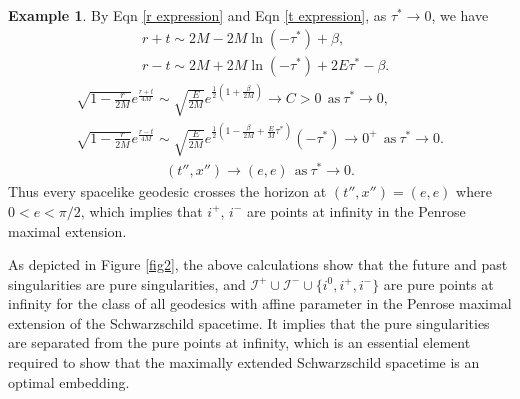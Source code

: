 \documentclass[pdflatex,sn-mathphys-num]{sn-jnl}
\makeatletter
\newcommand{\vast}{\bBigg@{2}}
\theoremstyle{definition}
\newtheorem{ex}[theorem]{Example}
\makeatother
\begin{document}
\begin{ex}
    By Eqn \ref{r expression} and Eqn \ref{t expression}, as $\tau^* \rightarrow 0$, we have
    \begin{align*}
        &r + t \sim 2M - 2M\ln{(-\tau^*)} + \beta,\\
        &r - t \sim 2M + 2M\ln{(-\tau^*)} + 2E\tau^* - \beta.
    \end{align*}
    \begin{align*}
        \sqrt{1 - \frac{r}{2M}}e^{\frac{r+t}{4M}} \sim \sqrt{\frac{E}{2M}}e^{\frac{1}{2}(1 + \frac{\beta}{2M})} \rightarrow C > 0~~\text{as}~\tau^* \rightarrow 0,\\
        \sqrt{1 - \frac{r}{2M}}e^{\frac{r-t}{4M}} \sim \sqrt{\frac{E}{2M}}e^{\frac{1}{2}(1 - \frac{\beta}{2M} + \frac{E}{M}\tau^*)}(-\tau^*) \rightarrow 0^+~~\text{as}~\tau^* \rightarrow 0.
    \end{align*}
    \begin{align}
        (t'',x'') \rightarrow (e,e)~~\text{as}~\tau^* \rightarrow 0.
    \end{align}
    Thus every spacelike geodesic crosses the horizon at $(t'',x'') = (e,e)$ where $ 0 < e < \pi/2$, which implies that $i^+$, $i^-$ are points at infinity in the Penrose maximal extension.
\end{ex}

As depicted in Figure \ref{fig2}, the above calculations show that the future and past singularities are pure singularities, and $\mathscr{I}^{+} \cup \mathscr{I}^{-} \cup \{i^0,i^{+},i^{-}\}$ are pure points at infinity for the class of all geodesics with affine parameter in the Penrose maximal extension of the Schwarzschild spacetime. It implies that the pure singularities are separated from the pure points at infinity, which is an essential element required to show that the maximally extended Schwarzschild spacetime is an optimal embedding.\\
\end{document}
